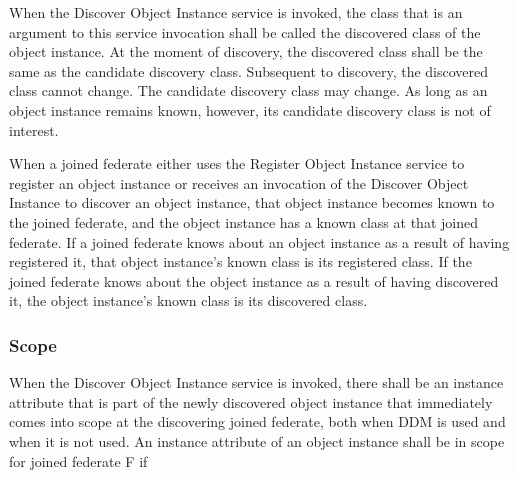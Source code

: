 \begin{compactstdpage}
    When the Discover Object Instance \rtiinitiated{} service is invoked, the class that is an argument to this service invocation shall be called the discovered class of the object instance. At the moment of discovery, the discovered class shall be the same as the candidate discovery class. Subsequent to discovery, the discovered class cannot change. The candidate discovery class may change. As long as an object instance remains known, however, its candidate discovery class is not of interest.


    When a joined federate either uses the Register Object Instance service to register an object instance or receives an invocation of the Discover Object Instance \rtiinitiated{} to discover an object instance, that object instance becomes known to the joined federate, and the object instance has a known class at that joined federate. If a joined federate knows about an object instance as a result of having registered it, that object instance's known class is its registered class. If the joined federate knows about the object instance as a result of having discovered it, the object instance's known class is its discovered class.

    \subsubsection{Scope}


    When the Discover Object Instance \rtiinitiated{} service is invoked, there shall be an instance attribute that is part of the newly discovered object instance that immediately comes into scope at the discovering joined federate, both when DDM is used and when it is not used. An instance attribute of an object instance shall be in scope for joined federate F if



\end{compactstdpage}

\clearpage

